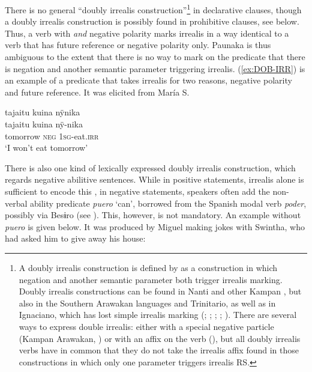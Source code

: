 There is no general “doubly irrealis construction”\footnote{A doubly irrealis construction is defined by \citet[271]{Michael2014} as a construction in which negation and another semantic parameter both trigger irrealis marking. Doubly irrealis constructions can be found in Nanti and other Kampan , but also in the Southern Arawakan languages  and Trinitario, as well as in Ignaciano, which has lost simple irrealis marking (\citealp[cf.][268]{EkdahlGrimes1964}; \citealt[132]{OlzaZubiri2004}; \citealt[279]{Michael2014}; \citealt[235]{Rose2014}; \citealt[108, 115]{DanielsenTerhartSubm}). There are several ways to express double irrealis: either with a special negative particle (Kampan Arawakan, ) or with an affix on the verb (), but all doubly irrealis verbs have in common that they do not take the irrealis affix found in those constructions in which only one parameter triggers irrealis RS.} in declarative clauses, though a doubly irrealis construction is possibly found in prohibitive clauses, see  below. Thus, a verb with  \textit{and} negative polarity marks irrealis in a way identical to a verb that has future reference or negative polarity only. Paunaka is thus ambiguous to the extent that there is no way to mark on the predicate that there is negation and another semantic parameter triggering irrealis. (\ref{ex:DOB-IRR}) is an example of a predicate that takes irrealis for two reasons, negative polarity and future reference. It was elicited from María S.

\ea\label{ex:DOB-IRR}
\begingl 
\glpreamble tajaitu kuina nÿnika\\
\gla tajaitu kuina nÿ-nika\\ 
\glb tomorrow \textsc{neg} 1\textsc{sg}-eat.\textsc{irr}\\ 
\glft ‘I won’t eat tomorrow’\\ 
\endgl
 \trailingcitation{[rxx-e-151017l]}
\xe

There is also one kind of lexically expressed doubly irrealis construction, which regards negative abilitive sentences. While in positive statements, irrealis alone is sufficient to encode this , in negative statements, speakers often add the non-verbal ability predicate \textit{puero} ‘can’, borrowed from the Spanish modal verb \textit{poder}, possibly via Besɨro (see ). This, however, is not mandatory. An example without \textit{puero} is given below. It was produced by Miguel making jokes with Swintha, who had asked him to give away his house:

